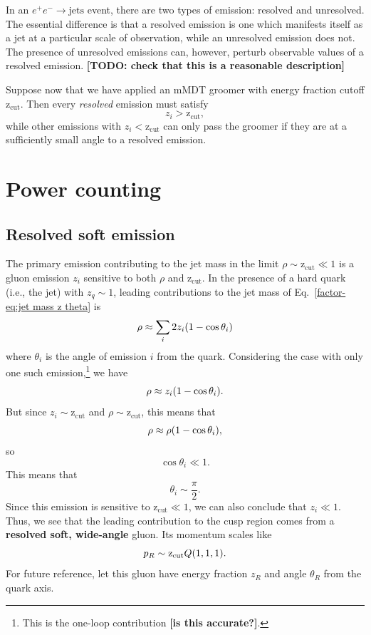 \documentclass[../thesis.tex]{subfiles}
\providecommand{\zcut}{\mathrm{z_{cut}}}
\begin{document}
	In an $e^+ e^- \to \text{jets}$ event, there are two types of emission: resolved and unresolved. The essential difference is that a resolved emission is one which manifests itself as a jet at a particular scale of observation, while an unresolved emission does not. The presence of unresolved emissions can, however, perturb observable values of a resolved emission. {\color{red}\textbf{[TODO: check that this is a reasonable description]}} 

	Suppose now that we have applied an mMDT groomer with energy fraction cutoff $\zcut$. Then every \textit{resolved} emission must satisfy
	\begin{equation}
		z_i > \zcut,
	\end{equation}
	while other emissions with $z_i < \zcut$ can only pass the groomer if they are at a sufficiently small angle to a resolved emission.

\section{Power counting}
\subsection{Resolved soft emission}
	The primary emission contributing to the jet mass in the limit $\rho \sim \zcut \ll 1$ is a gluon emission $z_i$ sensitive to both $\rho$ and $\zcut$. In the presence of a hard quark (i.e., the jet) with $z_q \sim 1$, leading contributions to the jet mass of Eq.~\ref{factor-eq:jet mass z theta} is
	\begin{equation}
		\rho \approx \sum_i 2z_i \qty(1 - \cos\theta_i)
	\end{equation}
	where $\theta_i$ is the angle of emission $i$ from the quark. Considering the case with only one such emission,\footnote{This is the one-loop contribution {\color{red}\textbf{[is this accurate?]}}.} we have
	\begin{equation}
		\rho \approx z_i \qty(1 - \cos\theta_i).
	\end{equation} 
	But since $z_i \sim \zcut$ and $\rho \sim \zcut$, this means that
	\begin{equation}
		\rho \approx \rho \qty(1 - \cos\theta_i),
	\end{equation}
	so
	\begin{equation}
		\cos\theta_i \ll 1.
	\end{equation}
	This means that
	\begin{equation}
		\theta_i \sim \frac{\pi}{2}.
	\end{equation}
	Since this emission is sensitive to $\zcut \ll 1$, we can also conclude that $z_i \ll 1$. Thus, we see that the leading contribution to the cusp region comes from a \textbf{resolved soft, wide-angle} gluon. Its momentum scales like
	\begin{equation}
		p_R \sim \zcut Q \qty(1, 1, 1).
	\end{equation}
	For future reference, let this gluon have energy fraction $z_R$ and angle $\theta_R$ from the quark axis.
\end{document}
